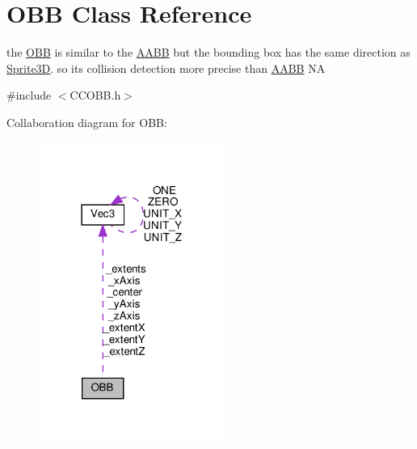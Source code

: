 \hypertarget{classOBB}{}\section{O\+BB Class Reference}
\label{classOBB}


the \hyperlink{classOBB}{O\+BB} is similar to the \hyperlink{classAABB}{A\+A\+BB} but the bounding box has the same direction as \hyperlink{classSprite3D}{Sprite3D}. so it\textquotesingle{}s collision detection more precise than \hyperlink{classAABB}{A\+A\+BB}  NA  




{\ttfamily \#include $<$C\+C\+O\+B\+B.\+h$>$}



Collaboration diagram for O\+BB\+:
\nopagebreak
\begin{figure}[H]
\begin{center}
\leavevmode
\includegraphics[width=174pt]{classOBB__coll__graph}
\end{center}
\end{figure}

